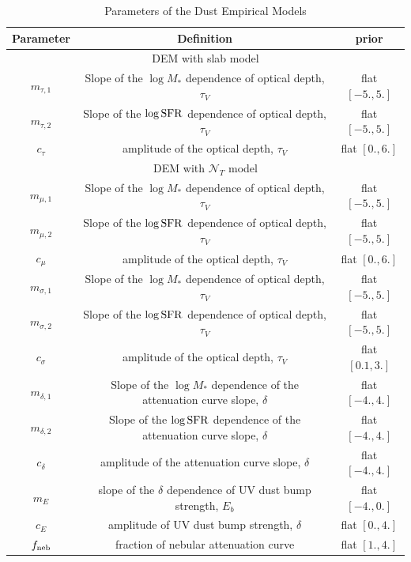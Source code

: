 \begin{table}
    \caption{Parameters of the Dust Empirical Models}
    \begin{center}
        \begin{tabular}{ccc} \toprule
            Parameter & Definition & prior\\[3pt] \hline\hline
            \multicolumn{3}{c}{DEM with slab model}\\ \hline
            $m_{\tau,1}$ & Slope of the $\log M_*$ dependence of optical depth,
            $\tau_V$ & flat $[-5., 5.]$\\
            $m_{\tau,2}$ & Slope of the $\log {\rm SFR}$ dependence of optical depth, $\tau_V$ & flat $[-5., 5.]$\\
            $c_{\tau}$ & amplitude of the optical depth, $\tau_V$ & flat $[0., 6.]$\\
            \hline
            \multicolumn{3}{c}{DEM with $\mathcal{N}_T$ model}\\ \hline
            $m_{\mu,1}$ & Slope of the $\log M_*$ dependence of optical depth,
            $\tau_V$ & flat $[-5., 5.]$\\
            $m_{\mu,2}$ & Slope of the $\log {\rm SFR}$ dependence of optical
            depth, $\tau_V$ & flat $[-5., 5.]$\\
            $c_{\mu}$ & amplitude of the optical depth, $\tau_V$ & flat $[0., 6.]$\\ 
            $m_{\sigma,1}$ & Slope of the $\log M_*$ dependence of optical depth, $\tau_V$ & flat $[-5., 5.]$\\
            $m_{\sigma,2}$ & Slope of the $\log {\rm SFR}$ dependence of optical depth, $\tau_V$ & flat $[-5., 5.]$\\
            $c_{\sigma}$ & amplitude of the optical depth, $\tau_V$ & flat $[0.1, 3.]$\\ 
            \hline
            $m_{\delta,1}$ & Slope of the $\log M_*$ dependence of the
            attenuation curve slope, $\delta$ & flat $[-4., 4.]$\\
            $m_{\delta,2}$ & Slope of the $\log {\rm SFR}$ dependence of the
            attenuation curve slope, $\delta$ & flat $[-4., 4.]$\\
            $c_{\delta}$ & amplitude of the attenuation curve slope, $\delta$ & flat $[-4., 4.]$\\
            $m_{E}$ & slope of the $\delta$ dependence of UV dust bump strength, $E_b$ & flat $[-4., 0.]$\\
            $c_{E}$ & amplitude of UV dust bump strength, $\delta$ & flat $[0., 4.]$\\
            $f_{\rm neb}$ & fraction of nebular attenuation curve & flat $[1., 4.]$\\
            \hline
        \end{tabular} \label{tab:free_param}
    \end{center}
\end{table}


